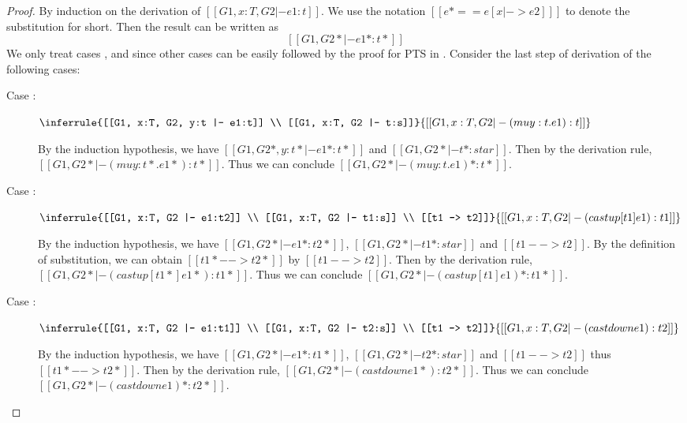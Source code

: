 \begin{proof}
    By induction on the derivation of $[[G1, x:T, G2 |- e1:t]]$. We use the notation $[[e* == e
[x |-> e2] ]]$ to denote the substitution for short. Then the result can be written as \[ [[G1, G2* |- e1*  : t* ]]\]
We only treat cases ,  and
 since other cases can be easily followed by the proof for PTS in \cite{handbook}.
Consider the last step of derivation of the following
cases:
    \begin{description}
        \item[Case :] $\inferrule{[[G1, x:T, G2, y:t |- e1:t]] \\
[[G1, x:T, G2 |- t:s]]}{[[G1, x:T, G2 |- (mu y:t.e1): t]]}$ 
        
        By the induction hypothesis, we have $[[G1, G2*, y:t* |- e1* : t*]]$ and $[[G1,
G2* |- t* : star]]$. Then by the derivation rule, $[[G1, G2* |- (mu
y:t*.e1*):t*]]$. Thus we can conclude $[[G1, G2* |- (mu y:t.e1)*:t*]]$.
        \item[Case :] $\inferrule{[[G1, x:T, G2 |- e1:t2]]
\\ [[G1, x:T, G2 |- t1:s]] \\ [[t1 --> t2]]}{[[G1, x:T, G2 |- (castup [t1]
e1):t1]]}$ 
        
        By the induction hypothesis, we have $[[G1, G2* |- e1*:t2*]]$, $[[G1, G2*
|- t1*:star]]$ and $[[t1 --> t2]]$. By the definition of substitution, we can
obtain $[[t1* --> t2*]]$ by $[[t1 --> t2]]$. Then by the derivation rule, $[[G1,
G2* |- (castup [t1*] e1*):t1*]]$. Thus we can conclude $[[G1, G2* |- (castup [t1]
e1)*:t1*]]$.
        \item[Case :] $\inferrule{[[G1, x:T, G2 |- e1:t1]]
\\ [[G1, x:T, G2 |- t2:s]] \\ [[t1 --> t2]]}{[[G1, x:T, G2 |- (castdown
e1):t2]]}$ 
        
        By the induction hypothesis, we have $[[G1, G2* |- e1*:t1*]]$, $[[G1, G2*
|- t2*:star]]$ and $[[t1 --> t2]]$ thus $[[t1* --> t2*]]$. Then by the
derivation rule, $[[G1, G2* |- (castdown e1*):t2*]]$. Thus we can conclude $[[G1, G2* |-
(castdown e1)*:t2*]]$.
    \end{description}
\end{proof}

